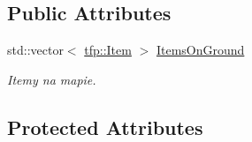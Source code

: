 \subsection*{Public Attributes}
\begin{DoxyCompactItemize}
\item 
\mbox{\label{classtfp_1_1_map_aa7e99b8fe950c22c21d2ce6953ff6b55}} 
std\+::vector$<$ \mbox{\hyperlink{structtfp_1_1_item}{tfp\+::\+Item}} $>$ \mbox{\hyperlink{classtfp_1_1_map_aa7e99b8fe950c22c21d2ce6953ff6b55}{Items\+On\+Ground}}
\begin{DoxyCompactList}\small\item\em Itemy na mapie. \end{DoxyCompactList}\end{DoxyCompactItemize}
\subsection*{Protected Attributes}
